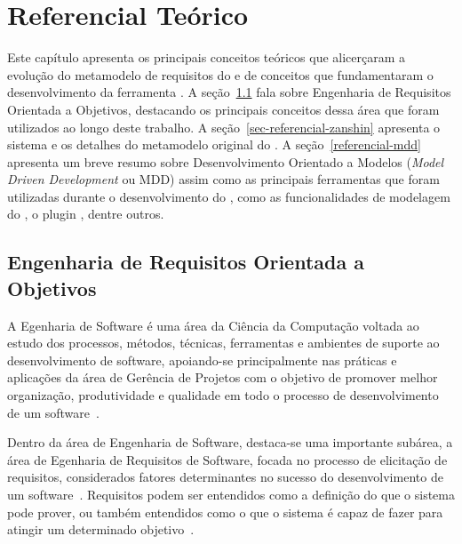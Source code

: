 
% 
\chapter{Referencial Teórico}
\label{sec-referencial}

Este capítulo apresenta os principais conceitos teóricos que alicerçaram a evolução do metamodelo de requisitos do \zanshin e de conceitos que fundamentaram o desenvolvimento da ferramenta \unagi. A seção~\ref{sec-referencial-engenharia-objetivos} fala sobre Engenharia de Requisitos Orientada a Objetivos, destacando os principais conceitos dessa área que foram utilizados ao longo deste trabalho. A seção~\ref{sec-referencial-zanshin} apresenta o sistema \zanshin e os detalhes do metamodelo original do \framework. A seção~\ref{referencial-mdd} apresenta um breve resumo sobre Desenvolvimento Orientado a Modelos (\textit{Model Driven Development} ou MDD) assim como  as principais ferramentas que foram utilizadas durante o desenvolvimento do \unagi, como as funcionalidades \emf de modelagem do \eclipse, o plugin \sirius, dentre outros.


\section{Engenharia de Requisitos Orientada a Objetivos}
\label{sec-referencial-engenharia-objetivos}

A Egenharia de Software é uma área da Ciência da Computação voltada ao estudo dos processos, métodos, técnicas, ferramentas e ambientes de suporte ao desenvolvimento de software, apoiando-se principalmente nas práticas e aplicações da área de Gerência de Projetos com o objetivo de promover melhor organização, produtividade e qualidade em todo o processo de desenvolvimento de um software~\cite{falboEngSoft}.

Dentro da área de Engenharia de Software, destaca-se uma importante subárea, a área de Egenharia de Requisitos de Software, focada no processo de elicitação de requisitos, considerados fatores determinantes no sucesso do desenvolvimento de um software~\cite{falboEngReq}. Requisitos podem ser entendidos como a definição do que o sistema pode prover, ou também entendidos como o que o sistema é capaz de fazer para atingir um determinado objetivo~\cite{pfleeger2004engenharia}.

